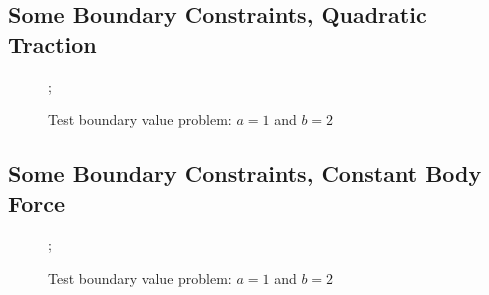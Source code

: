 \documentclass{article}
\begin{document}
\FloatBarrier
\subsection{Some Boundary Constraints,  Quadratic Traction}
\FloatBarrier

\begin{figure}
    ;
    \caption{Test boundary value problem: $a = 1$ and $b = 2$}
\centering
\end{figure}

\FloatBarrier
\subsection{Some Boundary Constraints, Constant Body Force}
\FloatBarrier

\begin{figure}
    ;
    \caption{Test boundary value problem: $a = 1$ and $b = 2$}
\centering
\end{figure}
\end{document}
